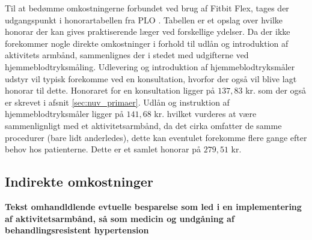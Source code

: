 Til at bedømme omkostningerne forbundet ved brug af Fitbit Flex, tages der udgangspunkt i honorartabellen fra PLO \citep{honorartabel2016}. Tabellen er et opslag over hvilke honorar der kan gives praktiserende læger ved forskellige ydelser.
Da der ikke forekommer nogle direkte omkostninger i forhold til udlån og introduktion af aktivitets armbånd, sammenlignes der i stedet med udgifterne ved hjemmeblodtryksmåling. Udlevering og introduktion af hjemmeblodtryksmåler udstyr vil typisk forekomme ved en konsultation, hvorfor der også vil blive lagt honorar til dette. Honoraret for en konsultation ligger på $137,83$ kr. som der også er skrevet i afsnit \autoref{sec:nuv_primaer}. Udlån og instruktion af hjemmeblodtryksmåler ligger på $141,68$ kr. hvilket vurderes at være sammenlignligt med et aktivitetsarmbånd, da det cirka omfatter de samme procedurer (bare lidt anderledes), dette kan eventulet forekomme flere gange efter behov hos patienterne. Dette er et samlet honorar på $279,51$ kr.

\subsection{Indirekte omkostninger}

\textbf{Tekst omhandldlende evtuelle besparelse som led i en implementering af aktivitetsarmbånd, så som medicin og undgåning af behandlingsresistent hypertension}













\begin{comment}
Hvad koster et Fitbit Flex? 
Hvilke besparelser tilbydes der så sundhedsektoren? 

Hvad koster det så at introducere patienterne til teknologien? 
	Hvad dækker den her introduktion minimum over, for at kunne anvende armbåndet? (Anvendelse af app og hvordan den skal oplades.)
	
Hvad koster det hvis de har spørgsmål vedr. teknologien? 


Langsigtet omkostninger - hvis behandlingen hjælper/ikke hjælper
- Besparelser vedr. medicinering 
- Besparelser vedr. ambulant forløb 
- Forebyggelse af behandlingsresistent hypertension = $$$$



EVT: Dags-takster i sekundær sektor (Ambulant).



En model i almen praktsis for implementeringen af aktivitetsarmbånd?

Honorartabel = \citep{honorartabel2016}
\end{comment}